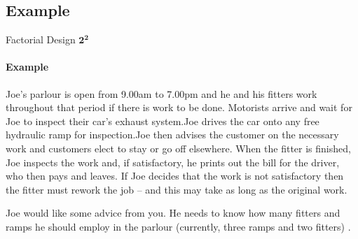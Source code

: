 \subsection{Example}
\begin{frame}{Factorial Design $\pmb{2^2}$}
\framesubtitle{Example}
    Joe’s parlour is open from 9.00am to 7.00pm and he and his fitters work throughout that period if there is work to be done. Motorists arrive and wait for Joe to inspect their car’s exhaust system.Joe drives the car onto any free hydraulic ramp for inspection.Joe then advises the customer on the necessary work and customers elect to stay or go off elsewhere. When the fitter is finished, Joe inspects the work and, if satisfactory, he prints out the bill for the driver, who then pays and leaves. If Joe decides that the work is not satisfactory  then the fitter must rework the job – and this may take as long as the original work. 
    
    Joe would like some advice from you. He needs to know how many fitters and ramps he should employ in the parlour (currently, three ramps and two fitters) \citep{pidd1998computer}.
\end{frame}